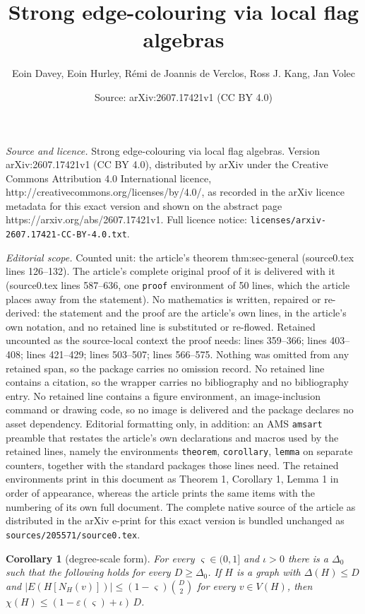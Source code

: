\documentclass[10pt,a4paper]{amsart}
\title{Strong edge-colouring via local flag algebras}
\author{Eoin Davey, Eoin Hurley, R\'emi de Joannis de Verclos, Ross J. Kang, Jan Volec}
\date{Source: arXiv:2607.17421v1 (CC BY 4.0)}
\newtheorem{corollary}{Corollary}
\begin{document}
\maketitle

\noindent\emph{Source and licence.} Strong edge-colouring via local flag algebras. Version arXiv:2607.17421v1 (CC BY 4.0), distributed by arXiv under the Creative Commons Attribution 4.0 International licence, http://creativecommons.org/licenses/by/4.0/, as recorded in the arXiv licence metadata for this exact version and shown on the abstract page https://arxiv.org/abs/2607.17421v1. Full licence notice: \texttt{licenses/arxiv-2607.17421-CC-BY-4.0.txt}.\par\smallskip

\noindent\textit{Editorial scope.} Counted unit: the article's theorem thm:sec-general (source0.tex lines 126--132). The article's complete original proof of it is delivered with it (source0.tex lines 587--636, one \texttt{proof} environment of 50 lines, which the article places away from the statement). No mathematics is written, repaired or re-derived: the statement and the proof are the article's own lines, in the article's own notation, and no retained line is substituted or re-flowed.  Retained uncounted as the source-local context the proof needs: lines 359--366; lines 403--408; lines 421--429; lines 503--507; lines 566--575.  Nothing was omitted from any retained span, so the package carries no omission record.  No retained line contains a citation, so the wrapper carries no bibliography and no bibliography entry.  No retained line contains a figure environment, an image-inclusion command or drawing code, so no image is delivered and the package declares no asset dependency.  Editorial formatting only, in addition: an AMS \texttt{amsart} preamble that restates the article's own declarations and macros used by the retained lines, namely the environments \texttt{theorem}, \texttt{corollary}, \texttt{lemma} on separate counters, together with the standard packages those lines need.  The retained environments print in this document as Theorem 1, Corollary 1, Lemma 1 in order of appearance, whereas the article prints the same items with the numbering of its own full document.  The complete native source of the article as distributed in the arXiv e-print for this exact version is bundled unchanged as \texttt{sources/205571/source0.tex}.
\begin{corollary}[degree-scale form]
\label{cor:hjk-scale}
For every $\varsigma \in (0, 1]$ and $\iota > 0$ there is a
$\Delta_0$ such that the following holds for every $D \geq \Delta_0$.
If $H$ is a graph with $\Delta(H) \leq D$ and
$|E(H[N_H(v)])| \leq (1 - \varsigma)\binom{D}{2}$ for every
$v \in V(H)$, then $\chi(H) \leq (1 - \varepsilon(\varsigma) + \iota)\,D$.
\end{corollary}
\end{document}
